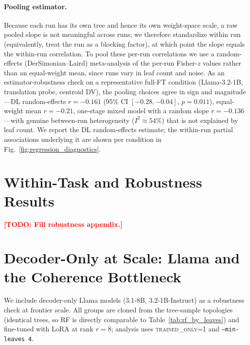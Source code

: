 \documentclass{article}
\theoremstyle{definition}
\theoremstyle{plain}
\newcommand{\TODO}[1]{\textcolor{red}{\textbf{[TODO: #1]}}}
\begin{document}
\paragraph{Pooling estimator.} Because each run has its own tree and hence its own weight-space scale, a
raw pooled slope is not meaningful across runs; we therefore standardize within run (equivalently, treat
the run as a blocking factor), at which point the slope equals the within-run correlation. To pool these
per-run correlations we use a random-effects (DerSimonian--Laird) meta-analysis of the per-run Fisher-$z$
values rather than an equal-weight mean, since runs vary in leaf count and noise. As an estimator-robustness check on a representative full-FT
condition (Llama-3.2-1B, translation probe, centroid DV), the pooling choices agree in sign and
magnitude---DL random-effects $r=-0.161$ ($95\%$ CI $[-0.28,-0.04]$, $p=0.011$), equal-weight mean
$r=-0.21$, one-stage mixed model with a random slope $r=-0.136$---with genuine between-run heterogeneity
($I^2\approx54\%$) that is not explained by leaf count. We report the DL random-effects estimate; the within-run partial
associations underlying it are shown per condition in Fig.~\ref{fig:regression_diagnostics}.

\iffalse
\section{Within-Task and Robustness Results}
\label{app:robustness}

\TODO{Fill robustness appendix.}

\section{Decoder-Only at Scale: Llama and the Coherence Bottleneck}
\label{app:llama}

We include decoder-only Llama models (3.1-8B, 3.2-1B-Instruct) as a robustness check at frontier
scale. All groups are cloned from the tree-sample topologies (identical trees, so RF is
directly comparable to Table~\ref{tab:rf_by_leaves}) and fine-tuned with LoRA at rank $r=8$;
analysis uses \textsc{trained\_only=1} and \texttt{--min-leaves 4}.
\end{document}
